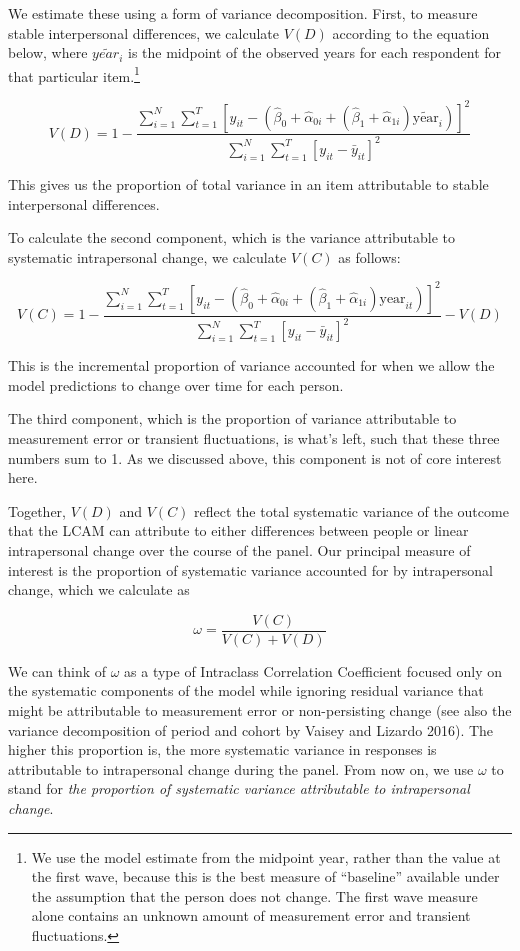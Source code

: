 \documentclass[
  12pt,
]{article}
\begin{document}
We estimate these using a form of variance decomposition. First, to
measure stable interpersonal differences, we calculate \(V(D)\)
according to the equation below, where \(\widetilde{year_i}\) is the
midpoint of the observed years for each respondent for that particular
item.\footnote{We use the model estimate from the midpoint year, rather
  than the value at the first wave, because this is the best measure of
  ``baseline'' available under the assumption that the person does not
  change. The first wave measure alone contains an unknown amount of
  measurement error and transient fluctuations.}

\[
V(D) = 1 - \frac{\sum_{i=1}^N \sum_{t=1}^T [y_{it} - (\hat{\beta}_0 + \hat{\alpha}_{0i} + (\hat{\beta}_1 + \hat{\alpha}_{1i}) \widetilde{\text{year}}_{i})]^2}{\sum_{i=1}^N \sum_{t=1}^T [y_{it} - \bar{y}_{it}]^2}
\]

This gives us the proportion of total variance in an item attributable
to stable interpersonal differences.

To calculate the second component, which is the variance attributable to
systematic intrapersonal change, we calculate \(V(C)\) as follows:

\[
V(C) = 1 - \frac{\sum_{i=1}^N \sum_{t=1}^T [y_{it} - (\hat{\beta}_0 + \hat{\alpha}_{0i} + (\hat{\beta}_1 + \hat{\alpha}_{1i}) \text{year}_{it})]^2}{\sum_{i=1}^N \sum_{t=1}^T [y_{it} - \bar{y}_{it}]^2} - V(D)
\]

This is the incremental proportion of variance accounted for when we
allow the model predictions to change over time for each person.

The third component, which is the proportion of variance attributable to
measurement error or transient fluctuations, is what's left, such that
these three numbers sum to 1. As we discussed above, this component is
not of core interest here.

Together, \(V(D)\) and \(V(C)\) reflect the total systematic variance of
the outcome that the LCAM can attribute to either differences between
people or linear intrapersonal change over the course of the panel. Our
principal measure of interest is the proportion of systematic variance
accounted for by intrapersonal change, which we calculate as

\[
\omega = \frac{V(C)}{V(C) + V(D)}
\]

We can think of \(\omega\) as a type of Intraclass Correlation
Coefficient focused only on the systematic components of the model while
ignoring residual variance that might be attributable to measurement
error or non-persisting change (see also the variance decomposition of
period and cohort by Vaisey and Lizardo 2016). The higher this
proportion is, the more systematic variance in responses is attributable
to intrapersonal change during the panel. From now on, we use \(\omega\)
to stand for \emph{the proportion of systematic variance attributable to
intrapersonal change}.
\end{document}
